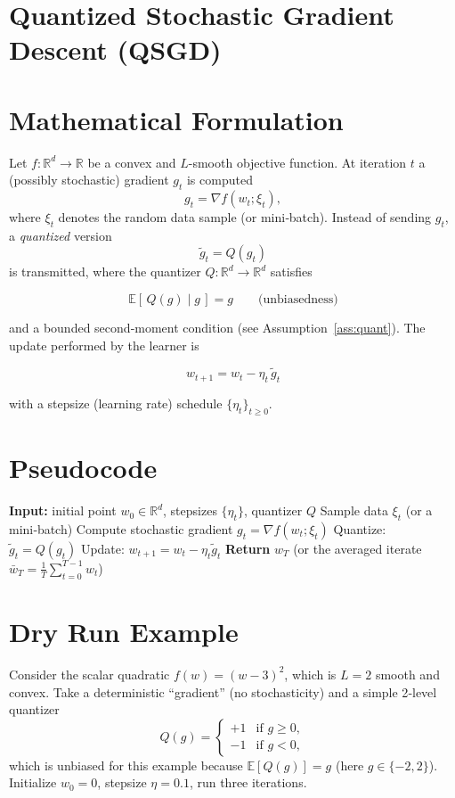 \documentclass{article}
\newcommand{\E}{\mathbb{E}}
\newcommand{\R}{\mathbb{R}}
\begin{document}
\section*{Quantized Stochastic Gradient Descent (QSGD)}

\section*{Mathematical Formulation}
Let $f:\R^{d}\rightarrow\R$ be a convex and $L$-smooth objective function.  
At iteration $t$ a (possibly stochastic) gradient $g_{t}$ is computed
\[
g_{t}= \nabla f(w_{t};\xi_{t}),
\]
where $\xi_{t}$ denotes the random data sample (or mini‑batch).  
Instead of sending $g_{t}$, a \emph{quantized} version
\[
\tilde g_{t}=Q(g_{t})
\]
is transmitted, where the quantizer $Q:\R^{d}\rightarrow\R^{d}$ satisfies  

\[
\boxed{\E[\,Q(g)\mid g\,]=g}\qquad\text{(unbiasedness)}\tag{1}
\]

and a bounded second‑moment condition (see Assumption~\ref{ass:quant}).  
The update performed by the learner is

\[
\boxed{w_{t+1}=w_{t}-\eta_{t}\,\tilde g_{t}} \tag{2}
\]

with a stepsize (learning rate) schedule $\{\eta_{t}\}_{t\ge 0}$.

\section*{Pseudocode}
\begin{algorithm}[H]
\caption{Quantized Stochastic Gradient Descent}
\begin{algorithmic}[1]
\State \textbf{Input:} initial point $w_{0}\in\R^{d}$, stepsizes $\{\eta_{t}\}$, quantizer $Q$
    \State Sample data $\xi_{t}$ (or a mini‑batch)
    \State Compute stochastic gradient $g_{t}= \nabla f(w_{t};\xi_{t})$
    \State Quantize: $\tilde g_{t}= Q(g_{t})$
    \State Update: $w_{t+1}= w_{t}-\eta_{t}\tilde g_{t}$
\EndFor
\State \textbf{Return} $w_{T}$ (or the averaged iterate $\bar w_{T}= \frac1T\sum_{t=0}^{T-1}w_{t}$)
\end{algorithmic}
\end{algorithm}

\section*{Dry Run Example}
Consider the scalar quadratic $f(w)=(w-3)^{2}$, which is $L=2$ smooth and convex.  
Take a deterministic “gradient” (no stochasticity) and a simple 2‑level quantizer
\[
Q(g)=\begin{cases}
+1 &\text{if }g\ge 0,\\
-1 &\text{if }g<0,
\end{cases}
\]
which is unbiased for this example because $\E[Q(g)]=g$ (here $g\in\{-2,2\}$).  
Initialize $w_{0}=0$, stepsize $\eta=0.1$, run three iterations.
\end{document}
